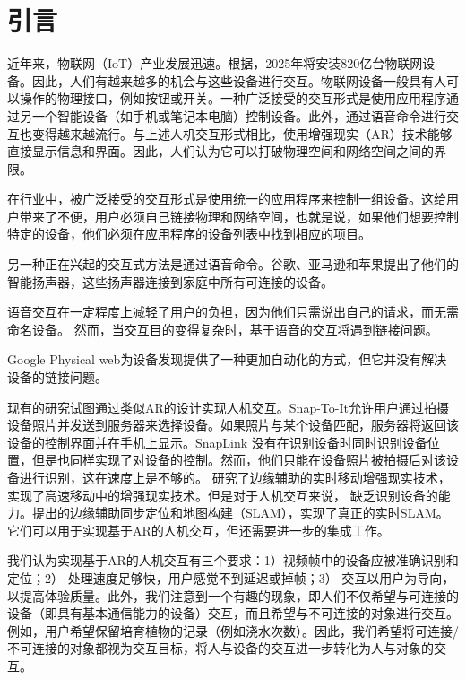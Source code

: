 \def\fr{30}
\def\edg{边缘服务端}
\def\fr{10}
\def\acc{72.7\%}
\def\idenT{93毫秒}
\def\uiT{20秒}

\chapter{引言}\label{sec:introduction}

近年来，物联网（IoT）产业发展迅速。根据\cite{macgillivray2019worldwide}，2025年将安装820亿台物联网设备。因此，人们有越来越多的机会与这些设备进行交互。物联网设备一般具有人可以操作的物理接口，例如按钮或开关。一种广泛接受的交互形式是使用应用程序通过另一个智能设备（如手机或笔记本电脑）控制设备\cite{homeass,xiaomi}。此外，通过语音命令进行交互也变得越来越流行\cite{li2019iot,porcheron2018voice}。与上述人机交互形式相比，使用增强现实（AR）技术能够直接显示信息和界面。因此，人们认为它可以打破物理空间和网络空间之间的界限。

在行业中，被广泛接受的交互形式是使用统一的应用程序来控制一组设备。这给用户带来了不便，用户必须自己链接物理和网络空间，也就是说，如果他们想要控制特定的设备，他们必须在应用程序的设备列表中找到相应的项目。

另一种正在兴起的交互式方法是通过语音命令。谷歌、亚马逊和苹果提出了他们的智能扬声器，这些扬声器连接到家庭中所有可连接的设备。

语音交互在一定程度上减轻了用户的负担，因为他们只需说出自己的请求，而无需命名设备。
然而，当交互目的变得复杂时，基于语音的交互将遇到链接问题。

Google Physical web\cite{jenson2014physical}为设备发现提供了一种更加自动化的方式，但它并没有解决设备的链接问题。

现有的研究试图通过类似AR的设计实现人机交互\cite{de2016snap,chen2018snaplink}。Snap-To-It\cite{de2016snap}允许用户通过拍摄设备照片并发送到服务器来选择设备。如果照片与某个设备匹配，服务器将返回该设备的控制界面并在手机上显示。SnapLink\cite{chen2018snaplink} 没有在识别设备时同时识别设备位置，但是也同样实现了对设备的控制。然而，他们只能在设备照片被拍摄后对该设备进行识别，这在速度上是不够的。\cite{liu2019edge} 研究了边缘辅助的实时移动增强现实技术，实现了高速移动中的增强现实技术。但是对于人机交互来说，\cite{liu2019edge} 缺乏识别设备的能力。\cite{ben2020edge,xu2020edge,liu2021edgesharing}提出的边缘辅助同步定位和地图构建（SLAM），实现了真正的实时SLAM。它们可以用于实现基于AR的人机交互，但还需要进一步的集成工作。

我们认为实现基于AR的人机交互有三个要求：1）视频帧中的设备应被准确识别和定位；2） 处理速度足够快，用户感觉不到延迟或掉帧；3） 交互以用户为导向，以提高体验质量。此外，我们注意到一个有趣的现象，即人们不仅希望与可连接的设备（即具有基本通信能力的设备）交互，而且希望与不可连接的对象进行交互。例如，用户希望保留培育植物的记录（例如浇水次数）。因此，我们希望将可连接/不可连接的对象都视为交互目标，将人与设备的交互进一步转化为人与对象的交互。

